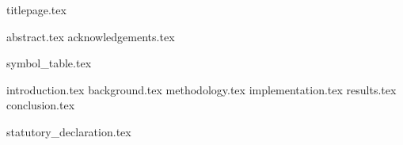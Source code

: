 \documentclass[fleqn,10pt,twoside]{article}
\begin{document}
  {titlepage.tex}

  \cleardoublepage
  {abstract.tex}
  {acknowledgements.tex}

  \setcounter{page}{0}

  \tableofcontents
  \listoffigures
  {symbol_table.tex}

  \cleardoublepage
  {introduction.tex}
  {background.tex}
  {methodology.tex}
  {implementation.tex}
  {results.tex}
  {conclusion.tex}


  \nocite{*}
  
  

  \cleardoublepage
  \appendix

  \cleardoublepage
  {statutory_declaration.tex}
\end{document}
